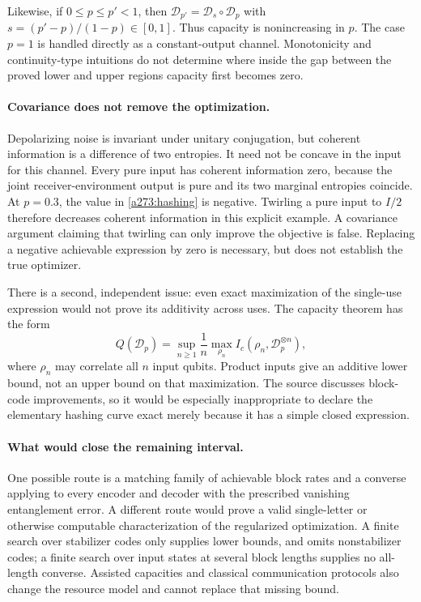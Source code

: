 \documentclass[11pt]{article}
\begin{document}
Likewise, if $0\le p\le p'<1$, then
$\mathcal D_{p'}=\mathcal D_s\circ\mathcal D_p$ with
$s=(p'-p)/(1-p)\in[0,1]$. Thus capacity is nonincreasing in $p$.
The case $p=1$ is handled directly as a constant-output channel.
Monotonicity and continuity-type intuitions do not determine where
inside the gap between the proved lower and upper regions capacity
first becomes zero.

\paragraph{Covariance does not remove the optimization.}
Depolarizing noise is invariant under unitary conjugation, but coherent
information is a difference of two entropies. It need not be concave
in the input for this channel. Every pure input has coherent information
zero, because the joint receiver-environment output is pure and its
two marginal entropies coincide. At $p=0.3$, the value in
\eqref{a273:hashing} is negative. Twirling a pure input to $I/2$
therefore decreases coherent information in this explicit example.
A covariance argument claiming that twirling can only improve the
objective is false. Replacing a negative achievable expression by
zero is necessary, but does not establish the true optimizer.

There is a second, independent issue: even exact maximization of the
single-use expression would not prove its additivity across uses.
The capacity theorem has the form
\[
 Q(\mathcal D_p)=\sup_{n\ge1}\frac1n
             \max_{\rho_n} I_c(\rho_n,\mathcal D_p^{\otimes n}),
\]
where $\rho_n$ may correlate all $n$ input qubits. Product inputs give
an additive lower bound, not an upper bound on that maximization.
The source discusses block-code improvements, so it would be especially
inappropriate to declare the elementary hashing curve exact merely
because it has a simple closed expression.

\paragraph{What would close the remaining interval.}
One possible route is a matching family of achievable block rates and
a converse applying to every encoder and decoder with the prescribed
vanishing entanglement error. A different route would prove a valid
single-letter or otherwise computable characterization of the
regularized optimization. A finite search over stabilizer codes only
supplies lower bounds, and omits nonstabilizer codes; a finite search
over input states at several block lengths supplies no all-length
converse. Assisted capacities and classical communication protocols
also change the resource model and cannot replace that missing bound.
\end{document}
